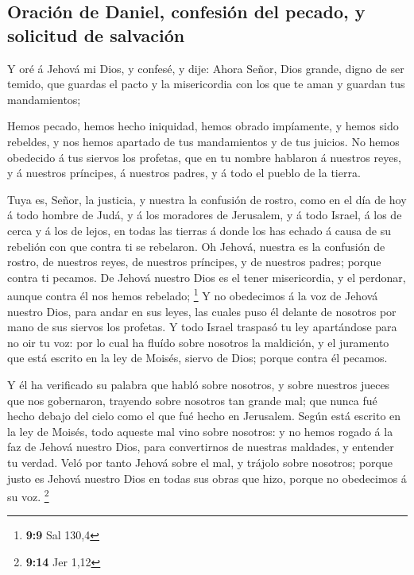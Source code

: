 \hypertarget{oraciuxf3n-de-daniel-confesiuxf3n-del-pecado-y-solicitud-de-salvaciuxf3n}{%
\subsection{Oración de Daniel, confesión del pecado, y solicitud de
salvación}\label{oraciuxf3n-de-daniel-confesiuxf3n-del-pecado-y-solicitud-de-salvaciuxf3n}}

 Y oré á Jehová mi Dios, y confesé, y dije: Ahora Señor,
Dios grande, digno de ser temido, que guardas el pacto y la misericordia
con los que te aman y guardan tus mandamientos;

 Hemos pecado, hemos hecho iniquidad, hemos obrado
impíamente, y hemos sido rebeldes, y nos hemos apartado de tus
mandamientos y de tus juicios.  No hemos obedecido á tus
siervos los profetas, que en tu nombre hablaron á nuestros reyes, y á
nuestros príncipes, á nuestros padres, y á todo el pueblo de la tierra.

 Tuya es, Señor, la justicia, y nuestra la confusión de
rostro, como en el día de hoy á todo hombre de Judá, y á los moradores
de Jerusalem, y á todo Israel, á los de cerca y á los de lejos, en todas
las tierras á donde los has echado á causa de su rebelión con que contra
ti se rebelaron.  Oh Jehová, nuestra es la confusión de
rostro, de nuestros reyes, de nuestros príncipes, y de nuestros padres;
porque contra ti pecamos.  De Jehová nuestro Dios es el
tener misericordia, y el perdonar, aunque contra él nos hemos rebelado;
\footnote{\textbf{9:9} Sal 130,4}  Y no obedecimos á la voz
de Jehová nuestro Dios, para andar en sus leyes, las cuales puso él
delante de nosotros por mano de sus siervos los profetas. 
Y todo Israel traspasó tu ley apartándose para no oir tu voz: por lo
cual ha fluído sobre nosotros la maldición, y el juramento que está
escrito en la ley de Moisés, siervo de Dios; porque contra él pecamos.

 Y él ha verificado su palabra que habló sobre nosotros, y
sobre nuestros jueces que nos gobernaron, trayendo sobre nosotros tan
grande mal; que nunca fué hecho debajo del cielo como el que fué hecho
en Jerusalem.  Según está escrito en la ley de Moisés, todo
aqueste mal vino sobre nosotros: y no hemos rogado á la faz de Jehová
nuestro Dios, para convertirnos de nuestras maldades, y entender tu
verdad.  Veló por tanto Jehová sobre el mal, y trájolo
sobre nosotros; porque justo es Jehová nuestro Dios en todas sus obras
que hizo, porque no obedecimos á su voz. \footnote{\textbf{9:14} Jer
  1,12}

